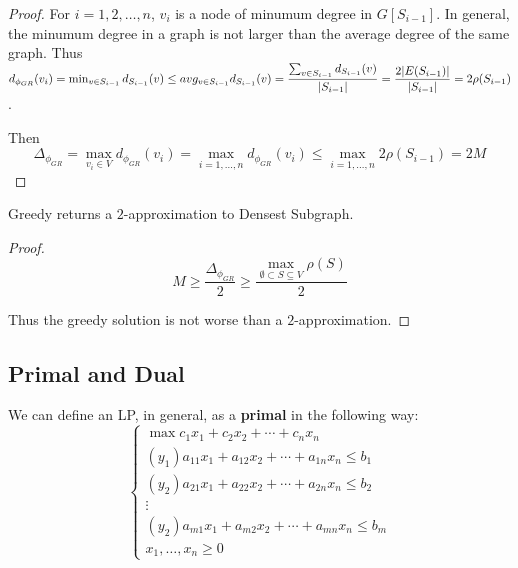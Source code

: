     \begin{proof}
        For $i = 1, 2, \dots, n$, $v_i$ is a node of minumum degree in $G[S_{i-1}]$.
        In general, the minumum degree in a graph is not larger than the average degree of the same graph.
        Thus $d_{\phi_{GR}}(v_i) = \min_{v \in S_{i-1}} d_{S_{i-1}}(v) \leq avg_{v \in S_{i-1}} d_{S_{i-1}}(v) =
        \dfrac{\sum_{v \in S_{i-1}} d_{S_{i-1}}(v)}{\vert S_{i-1} \vert} = \dfrac{2 \vert E(S_{i-1}) \vert}{\vert S_{i-1} \vert} = 2\rho(S_{i-1})$.

        Then
        \[ \Delta_{\phi_{GR}} = \max_{v_i \in V} d_{\phi_{GR}}(v_i) = \max_{i=1, \dots, n} d_{\phi_{GR}}(v_i) \leq
        \max_{i=1, \dots, n} 2 \rho(S_{i-1}) = 2M \]
    \end{proof}

    \begin{corollary}
        Greedy returns a $2$-approximation to Densest Subgraph.
    \end{corollary}

    \begin{proof}
        \[ M \geq \dfrac{\Delta_{\phi_{GR}}}{2} \geq \dfrac{\max_{\emptyset \subset S \subseteq V} \rho(S)}{2} \]

        Thus the greedy solution is not worse than a $2$-approximation.
    \end{proof}


\subsection{Primal and Dual}

    We can define an LP, in general, as a \textbf{primal} in the following way:
    \begin{equation}
        \begin{cases}
            \max c_1 x_1 + c_2 x_2 + \cdots + c_n x_n\\
            (y_1) a_{11} x_1 + a_{12} x_2 + \cdots + a_{1n} x_n \leq b_1\\
            (y_2) a_{21} x_1 + a_{22} x_2 + \cdots + a_{2n} x_n \leq b_2\\
            \vdots\\
            (y_2) a_{m1} x_1 + a_{m2} x_2 + \cdots + a_{mn} x_n \leq b_m\\
            x_1, \dots, x_n \geq 0
        \end{cases}
    \end{equation}

